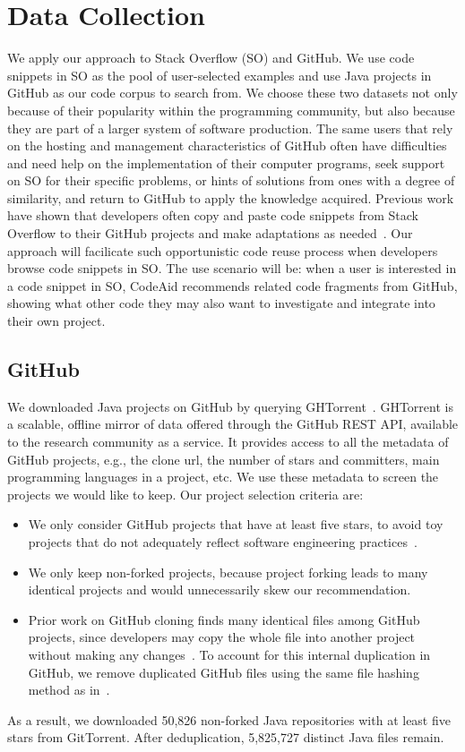 \section{Data Collection}
\label{sec:dataset}
We apply our approach to Stack Overflow (SO) and GitHub. We use code snippets in SO as the pool of user-selected examples and use Java projects in GitHub as our code corpus to search from. We choose these two datasets not only because of their popularity within the programming community, but also because they are part of a larger system of software production. The same users that rely on the hosting and management characteristics of GitHub often have difficulties and need help on the implementation of their computer programs, seek support on SO for their specific problems, or hints of solutions from ones with a degree of similarity, and return to GitHub to apply the knowledge acquired. Previous work have shown that developers often copy and paste code snippets from Stack Overflow to their GitHub projects and make adaptations as needed~\cite{yang2017stack, an2017stack, wu2018developers, zhang2019analyzing}. Our approach will facilicate such opportunistic code reuse process when developers browse code snippets in SO. The use scenario will be: when a user is interested in a code snippet in SO, CodeAid recommends related code fragments from GitHub, showing what other code they may also want to investigate and integrate into their own project. 


\subsection{GitHub}
We downloaded Java projects on GitHub by querying GHTorrent~\cite{gousios2012ghtorrent}. GHTorrent is a scalable, offline mirror of data offered through the GitHub REST API, available to the research community as a service. It provides access to all the metadata of GitHub projects, e.g., the clone url, the number of stars and committers, main programming languages in a project, etc. We use these metadata to screen the projects we would like to keep. Our project selection criteria are:
\begin{itemize}
	\item We only consider GitHub projects that have at least five stars, to avoid toy projects that do not adequately reflect software engineering practices~\cite{kalliamvakou2014promises}.
	\item We only keep non-forked projects, because project forking leads to many identical projects and would unnecessarily skew our recommendation.
	\item Prior work on GitHub cloning finds many identical files among GitHub projects, since developers may copy the whole file into another project without making any changes~\cite{lopes2017dejavu}. To account for this internal duplication in GitHub, we remove duplicated GitHub files using the same file hashing method as in~\cite{lopes2017dejavu}.
\end{itemize} 
As a result, we downloaded 50,826 non-forked Java repositories with at least five stars from GitTorrent. After deduplication, 5,825,727 distinct Java files remain.


